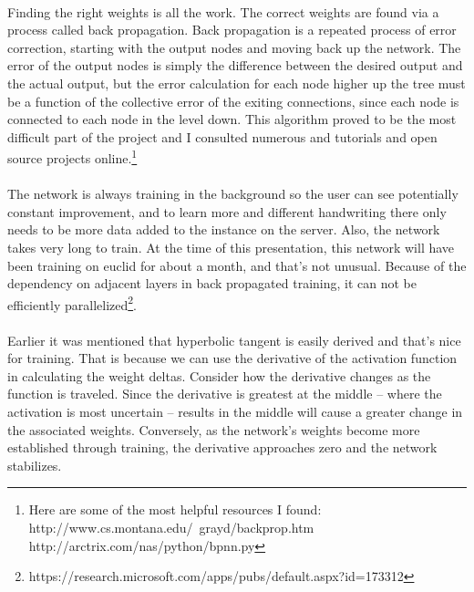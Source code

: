 \documentclass{article}
\begin{document}
    \paragraph{}Finding the right weights is all the work. The correct weights are found
    via a process called back propagation. Back propagation is a repeated process of error 
    correction, starting with the output nodes and moving back up the network. The error
    of the output nodes is simply the difference between the desired output and the actual
    output, but the error calculation for each node higher up the tree must be a function
    of the collective error of the exiting connections, since each node is connected to each
    node in the level down. This algorithm proved to be the most difficult part of the project
    and I consulted numerous and tutorials and open source projects online.\footnote{Here are
    some of the most helpful resources I found: \\  
    http://www.cs.montana.edu/~grayd/backprop.htm \\ 
    http://arctrix.com/nas/python/bpnn.py}
    \paragraph{}The network is always training in the background so the user can see 
    potentially constant improvement, and to learn more and different handwriting there 
    only needs to be more data added to the instance on the server. Also, the network takes 
    very long to train. At the time of this presentation, this network will have been 
    training on euclid for about a month, and that's not unusual. Because of the dependency on 
    adjacent layers in back propagated training, it can not be efficiently parallelized\footnote{https://research.microsoft.com/apps/pubs/default.aspx?id=173312}.
    \paragraph{}Earlier it was mentioned that hyperbolic tangent is easily derived and that's
    nice for training. That is because we can use the derivative of the activation function
    in calculating the weight deltas. Consider how the derivative changes as the function
    is traveled. Since the derivative is greatest at the middle -- where the activation is
    most uncertain -- results in the middle will cause a greater change in the associated
    weights. Conversely, as the network's weights become more established through training, 
    the derivative approaches zero and the network stabilizes.
\end{document}
